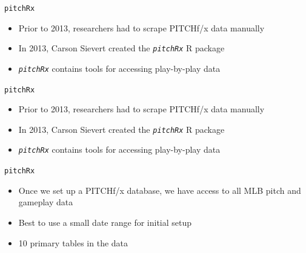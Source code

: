 \documentclass[14pt,ignorenonframetext,aspectratio = 1610]{beamer}
\newenvironment{Shaded}{\begin{snugshade}}{\end{snugshade}}
\newcommand{\KeywordTok}[1]{\textcolor[rgb]{0.13,0.29,0.53}{\textbf{{#1}}}}
\newcommand{\DataTypeTok}[1]{\textcolor[rgb]{0.13,0.29,0.53}{{#1}}}
\newcommand{\StringTok}[1]{\textcolor[rgb]{0.31,0.60,0.02}{{#1}}}
\newcommand{\OtherTok}[1]{\textcolor[rgb]{0.56,0.35,0.01}{{#1}}}
\newcommand{\NormalTok}[1]{{#1}}
\providecommand{\tightlist}{%
\setlength{\itemsep}{0pt}\setlength{\parskip}{0pt}}
\begin{document}
\begin{frame}[fragile]{\texttt{pitchRx}}

\begin{itemize}
\tightlist
\item
  Prior to 2013, researchers had to scrape PITCHf/x data manually
\item
  In 2013, Carson Sievert created the \emph{\texttt{pitchRx}} R package
\item
  \emph{\texttt{pitchRx}} contains tools for accessing play-by-play data
\end{itemize}

\end{frame}

\begin{frame}[fragile]{\texttt{pitchRx}}

\begin{itemize}
\tightlist
\item
  Prior to 2013, researchers had to scrape PITCHf/x data manually
\item
  In 2013, Carson Sievert created the \emph{\texttt{pitchRx}} R package
\item
  \emph{\texttt{pitchRx}} contains tools for accessing play-by-play data
\end{itemize}

\footnotesize

\begin{Shaded}
\end{Shaded}

\end{frame}

\begin{frame}{\texttt{pitchRx}}

\begin{itemize}
\tightlist
\item
  Once we set up a PITCHf/x database, we have access to all MLB pitch
  and gameplay data
\item
  Best to use a small date range for initial setup
\item
  10 primary tables in the data
\end{itemize}

\end{frame}
\end{document}
